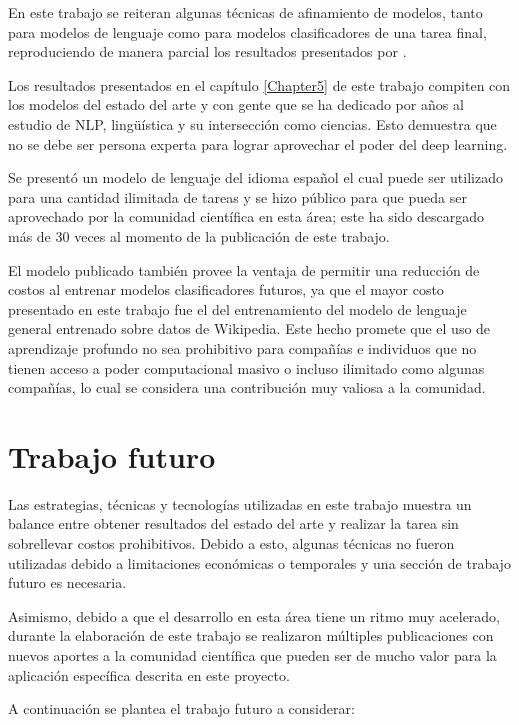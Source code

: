 En este trabajo se reiteran algunas técnicas de afinamiento de modelos, tanto para modelos de lenguaje como para modelos clasificadores de una tarea final, reproduciendo de manera parcial los resultados presentados por \citeauthor{howard2018}.

Los resultados presentados en el capítulo \ref{Chapter5} de este trabajo compiten con los modelos del estado del arte y con gente que se ha dedicado por años al estudio de NLP, lingüística y su intersección como ciencias. Esto demuestra que no se debe ser persona experta para lograr aprovechar el poder del deep learning.

Se presentó un modelo de lenguaje del idioma español el cual puede ser utilizado para una cantidad ilimitada de tareas y se hizo público para que pueda ser aprovechado por la comunidad científica en esta área; este ha sido descargado más de 30 veces al momento de la publicación de este trabajo.

El modelo publicado también provee la ventaja de permitir una reducción de costos al entrenar modelos clasificadores futuros, ya que el mayor costo presentado en este trabajo fue el del entrenamiento del modelo de lenguaje general entrenado sobre datos de Wikipedia. Este hecho promete que el uso de aprendizaje profundo no sea prohibitivo para compañías e individuos que no tienen acceso a poder computacional masivo o incluso ilimitado como algunas compañías, lo cual se considera una contribución muy valiosa a la comunidad.

\section{Trabajo futuro}

Las estrategias, técnicas y tecnologías utilizadas en este trabajo muestra un balance entre obtener resultados del estado del arte y realizar la tarea sin sobrellevar costos prohibitivos. Debido a esto, algunas técnicas no fueron utilizadas debido a limitaciones económicas o temporales y una sección de trabajo futuro es necesaria.

Asimismo, debido a que el desarrollo en esta área tiene un ritmo muy acelerado, durante la elaboración de este trabajo se realizaron múltiples publicaciones con nuevos aportes a la comunidad científica que pueden ser de mucho valor para la aplicación específica descrita en este proyecto.

A continuación se plantea el trabajo futuro a considerar:

